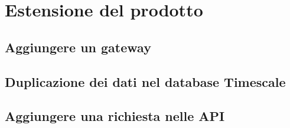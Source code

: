 \section{Estensione del prodotto}
	\subsection{Aggiungere un gateway}
	\subsection{Duplicazione dei dati nel database Timescale}
	\subsection{Aggiungere una richiesta nelle API} %
